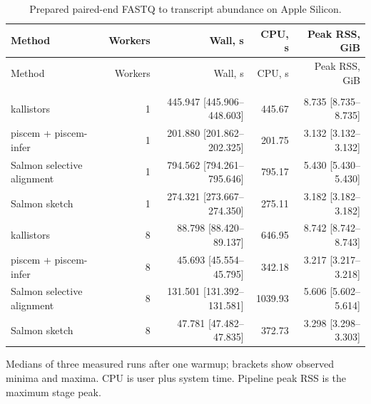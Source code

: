 \begingroup
\small
\setlength{\tabcolsep}{4pt}
\begin{longtable}{@{}lrrrr@{}}
\caption{Prepared paired-end FASTQ to transcript abundance on Apple Silicon.}\label{tab:paper-bulk-paired}\\
\toprule
Method & Workers & Wall, s & CPU, s & Peak RSS, GiB \\
\midrule
\endfirsthead
\toprule
Method & Workers & Wall, s & CPU, s & Peak RSS, GiB \\
\midrule
\endhead
\bottomrule
\endfoot
\addlinespace
\multicolumn{5}{@{}l}{\textit{SRR10919051}} \\
kallistors & 1 & 445.947 [445.906--448.603] & 445.67 & 8.735 [8.735--8.735] \\
piscem + piscem-infer & 1 & 201.880 [201.862--202.325] & 201.75 & 3.132 [3.132--3.132] \\
Salmon selective alignment & 1 & 794.562 [794.261--795.646] & 795.17 & 5.430 [5.430--5.430] \\
Salmon sketch & 1 & 274.321 [273.667--274.350] & 275.11 & 3.182 [3.182--3.182] \\
kallistors & 8 & 88.798 [88.420--89.137] & 646.95 & 8.742 [8.742--8.743] \\
piscem + piscem-infer & 8 & 45.693 [45.554--45.795] & 342.18 & 3.217 [3.217--3.218] \\
Salmon selective alignment & 8 & 131.501 [131.392--131.581] & 1039.93 & 5.606 [5.602--5.614] \\
Salmon sketch & 8 & 47.781 [47.482--47.835] & 372.73 & 3.298 [3.298--3.303] \\
\end{longtable}
\noindent\footnotesize Medians of three measured runs after one warmup; brackets show observed minima and maxima. CPU is user plus system time. Pipeline peak RSS is the maximum stage peak.
\endgroup
